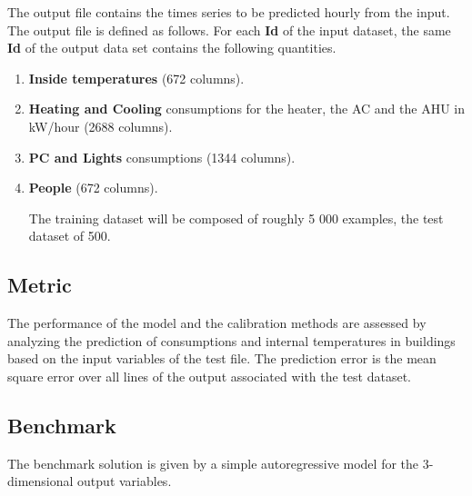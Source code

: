\documentclass[nolayout]{article}
\begin{document}
    The output file contains the times series to be predicted hourly from the input. The output file is defined as follows. For each {\bf Id} of the input dataset, the same {\bf Id} of the output data set contains the following quantities.
    \begin{enumerate}[-]
    \item {\bf Inside temperatures} (672 columns).
    \item {\bf Heating and Cooling} consumptions for the heater, the AC and the AHU in kW/hour (2688 columns).
    \item {\bf PC and Lights} consumptions (1344 columns).
    \item {\bf People} (672 columns).
    
The training dataset will be composed of roughly 5 000 examples, the test dataset of 500.
\end{enumerate}


\subsection*{Metric}
The performance of the model and the calibration methods are assessed by analyzing the prediction of consumptions and internal temperatures in buildings based on the input variables of the test file. The prediction error is the mean square error over all lines of the output associated with the test dataset. 

\subsection*{Benchmark}
The benchmark solution is given by a simple autoregressive model for the $3$-dimensional output variables.
\end{document}
